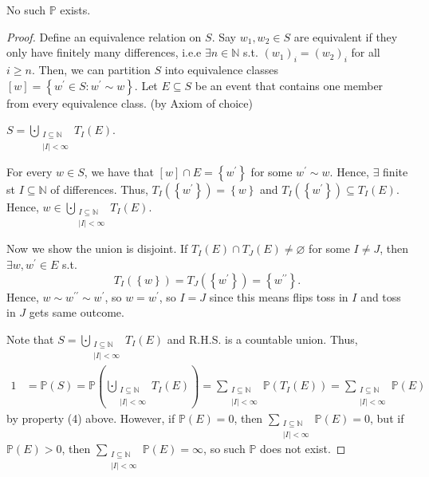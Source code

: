 \begin{proposition}
    No such \(\mathbb{P}\) exists. 
\end{proposition}
\begin{proof}
    Define an equivalence relation on \(S\). Say \(w_1, w_2 \in S\) are equivalent if they only have finitely many differences, i.e.e \(\exists n \in \mathbb{N}\) s.t. \((w_1)_i = (w_2)_i\) for all \(i \ge n\). Then, we can partition \(S\) into equivalence classes \([w] = \left\{ w^{\prime} \in S: w^{\prime} \sim w \right\} \). Let \(E \subseteq S\) be an event that contains one member from every equivalence class. (by Axiom of choice) 
    \begin{claim}
        \(S = \bigcupdot_{\substack{I \subseteq \mathbb{N} \\ \vert I \vert < \infty}} T_I(E) \). 
    \end{claim}        
    \begin{explanation}
        For every \(w \in S\), we have that \([w] \cap E = \left\{ w^{\prime} \right\} \) for some \(w^{\prime} \sim w\). Hence, \(\exists \) finite st \(I \subseteq \mathbb{N} \) of differences. Thus, \(T_I (\left\{ w^{\prime}  \right\} ) = \left\{ w \right\} \) and \(T_I (\left\{ w^{\prime}  \right\} ) \subseteq T_I(E)\). Hence, \(w \in \bigcupdot_{\substack{I \subseteq \mathbb{N} \\ \vert I \vert < \infty}} T_I(E)\).

        Now we show the union is disjoint. If \(T_I(E) \cap T_J(E) \neq \varnothing \) for some \(I \neq J\), then \(\exists w, w^{\prime} \in E\) s.t. 
        \[
            T_I(\left\{ w \right\} ) = T_J(\left\{ w^{\prime} \right\} ) = \left\{ w^{\prime\prime}  \right\}. 
        \]
        Hence, \(w \sim w^{\prime\prime} \sim w^{\prime}\), so \(w = w^{\prime}\), so \(I = J\) since this means flips toss in \(I\) and toss in \(J\) gets same outcome.             
    \end{explanation}

    Note that \(S = \bigcupdot_{\substack{I \subseteq \mathbb{N} \\ \vert I \vert < \infty}} T_I(E)\) and R.H.S. is a countable union. Thus,
    \begin{align*}
        1 &= \mathbb{P} (S) = \mathbb{P} \left( \bigcupdot_{\substack{I \subseteq \mathbb{N} \\ \vert I \vert < \infty}} T_I(E) \right) = \sum_{\substack{I \subseteq \mathbb{N} \\ \vert I \vert < \infty }} \mathbb{P} (T_I(E)) = \sum_{\substack{I \subseteq \mathbb{N} \\ \vert I \vert < \infty }} \mathbb{P} (E)
    \end{align*} 
    by property (4) above. However, if \(\mathbb{P} (E) = 0\), then \(\sum_{\substack{I \subseteq \mathbb{N} \\ \vert I \vert < \infty }} \mathbb{P} (E) = 0\), but if \(\mathbb{P} (E) > 0\), then \(\sum_{\substack{I \subseteq \mathbb{N} \\ \vert I \vert < \infty }} \mathbb{P} (E) = \infty\), so such \(\mathbb{P} \) does not exist.     
\end{proof}

